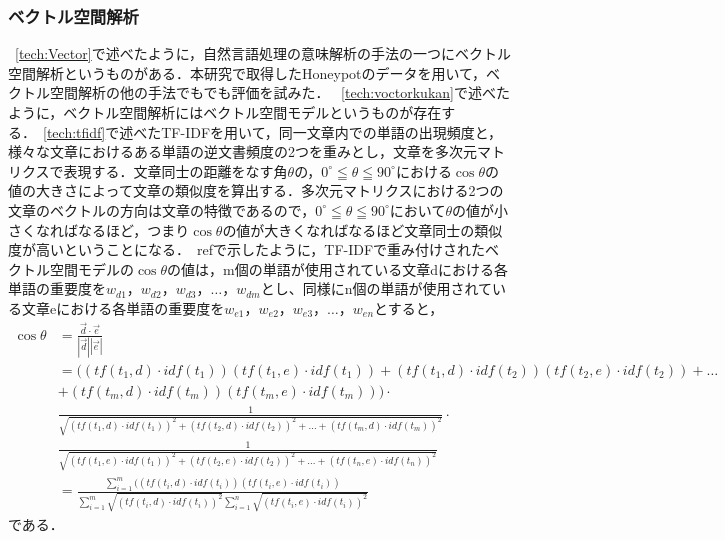 \subsubsection{ベクトル空間解析}
~\ref{tech:Vector}で述べたように，自然言語処理の意味解析の手法の一つにベクトル空間解析というものがある．本研究で取得したHoneypotのデータを用いて，ベクトル空間解析の他の手法でもでも評価を試みた．
~\ref{tech:voctorkukan}で述べたように，ベクトル空間解析にはベクトル空間モデルというものが存在する．~\ref{tech:tfidf}で述べたTF-IDFを用いて，同一文章内での単語の出現頻度と，様々な文章におけるある単語の逆文書頻度の2つを重みとし，文章を多次元マトリクスで表現する．文章同士の距離をなす角$ \theta $の，$ 0^\circ \leqq \theta \leqq 90^\circ $における$ \cos \theta $の値の大きさによって文章の類似度を算出する．多次元マトリクスにおける2つの文章のベクトルの方向は文章の特徴であるので，$ 0^\circ \leqq \theta \leqq 90^\circ $において$ \theta $の値が小さくなればなるほど，つまり$ \cos \theta $の値が大きくなればなるほど文章同士の類似度が高いということになる．~ref{}で示したように，TF-IDFで重み付けされたベクトル空間モデルの$ \cos \theta $の値は，m個の単語が使用されている文章dにおける各単語の重要度を$ w_{d1}，w_{d2}，w_{d3}， \ldots ，w_{dm} $とし、同様にn個の単語が使用されている文章eにおける各単語の重要度を$ w_{e1}，w_{e2}，w_{e3}， \ldots ，w_{en} $とすると，\\
\begin{align}
\cos \theta &= \frac{\vec{d} \cdot \vec{e}}{|\vec{d}| |\vec{e}|} \nonumber \\
            &= ((tf(t_{1},d) \cdot idf(t_{1}))(tf(t_{1},e) \cdot idf(t_{1})) + (tf(t_{1},d) \cdot idf(t_{2}))(tf(t_{2},e) \cdot idf(t_{2})) + \ldots \nonumber \\
            &+ (tf(t_{m},d) \cdot idf(t_{m}))(tf(t_{m},e) \cdot idf(t_{m}))) \cdot \nonumber \\
            &\frac{1}{\sqrt{(tf(t_{1},d) \cdot idf(t_{1}))^2 + (tf(t_{2},d) \cdot idf(t_{2}))^2 + \ldots + (tf(t_{m},d) \cdot idf(t_{m}))^2}} \cdot \nonumber \\[2mm]
            &\frac{1}{\sqrt{(tf(t_{1},e) \cdot idf(t_{1}))^2 + (tf(t_{2},e) \cdot idf(t_{2}))^2 + \ldots + (tf(t_{n},e) \cdot idf(t_{n}))^2}} \nonumber \\[2mm]
            &= \frac{ \sum_{i=1}^{m} ((tf(t_{i},d) \cdot idf(t_{i}))(tf(t_{i},e) \cdot idf(t_{i}))}{\sum_{i=1}^{m} \sqrt{(tf(t_{i},d) \cdot idf(t_{i}))^2} \sum_{i=1}^{n} \sqrt{(tf(t_{i},e) \cdot idf(t_{i}))^2}} \nonumber
\end{align}
である．


